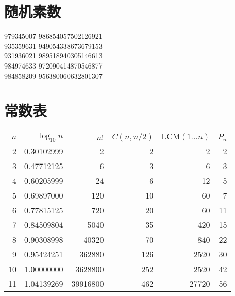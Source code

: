 
\section{随机素数}
979345007 986854057502126921\\
935359631 949054338673679153\\
931936021 989518940305146613\\
984974633 972090414870546877\\
984858209 956380060632801307\\
\section{常数表}
\begin{center}
    \begin{tabular}{|r|r|r|r|r|r|}  
        \hline
        \rowcolor{gray!20}
        $n$         & $\log_{10}n$  & $n!$          & $C(n,n/2)$    & $\mathrm{LCM}(1...n)$ & $P_n$         \\ \hline  
        2           & 0.30102999    & 2             & 2             & 2                     & 2             \\ \hline 
        3           & 0.47712125    & 6             & 3             & 6                     & 3             \\ \hline 
        4           & 0.60205999    & 24            & 6             & 12                    & 5             \\ \hline 
        5           & 0.69897000    & 120           & 10            & 60                    & 7             \\ \hline 
        6           & 0.77815125    & 720           & 20            & 60                    & 11            \\ \hline 
        7           & 0.84509804    & 5040          & 35            & 420                   & 15            \\ \hline 
        8           & 0.90308998    & 40320         & 70            & 840                   & 22            \\ \hline 
        9           & 0.95424251    & 362880        & 126           & 2520                  & 30            \\ \hline 
        10          & 1.00000000    & 3628800       & 252           & 2520                  & 42            \\ \hline 
        11          & 1.04139269    & 39916800      & 462           & 27720                 & 56            \\ \hline 

\end{tabular}
\end{center}
